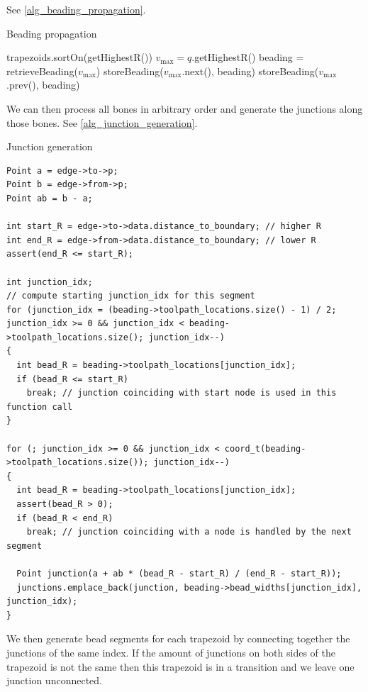 See \cref{alg_beading_propagation}.

\begin{algorithm}
\caption{Beading propagation}
\label{alg_beading_propagation}
\begin{algorithmic}
\State trapezoids.sortOn(getHighestR())
	\State $v_\text{max} = q$.getHighestR()
	\State beading = retrieveBeading($v_\text{max}$)
		\State storeBeading($v_\text{max}$.next(), beading)
	\EndIf
		\State storeBeading($v_\text{max}$.prev(), beading)
	\EndIf
\EndFor
\end{algorithmic}
\end{algorithm}


We can then process all bones in arbitrary order and generate the junctions along those bones.
See \cref{alg_junction_generation}.

\begin{algorithm}
\caption{Junction generation}
\label{alg_junction_generation}
\lstset{language=C++}
\begin{lstlisting}[frame=single]
Point a = edge->to->p;
Point b = edge->from->p;
Point ab = b - a;

int start_R = edge->to->data.distance_to_boundary; // higher R
int end_R = edge->from->data.distance_to_boundary; // lower R
assert(end_R <= start_R);

int junction_idx;
// compute starting junction_idx for this segment
for (junction_idx = (beading->toolpath_locations.size() - 1) / 2; junction_idx >= 0 && junction_idx < beading->toolpath_locations.size(); junction_idx--)
{
  int bead_R = beading->toolpath_locations[junction_idx];
  if (bead_R <= start_R)
    break; // junction coinciding with start node is used in this function call
}

for (; junction_idx >= 0 && junction_idx < coord_t(beading->toolpath_locations.size()); junction_idx--)
{
  int bead_R = beading->toolpath_locations[junction_idx];
  assert(bead_R > 0);
  if (bead_R < end_R)
    break; // junction coinciding with a node is handled by the next segment
  
  Point junction(a + ab * (bead_R - start_R) / (end_R - start_R));
  junctions.emplace_back(junction, beading->bead_widths[junction_idx], junction_idx);
}
\end{lstlisting}
\end{algorithm}


We then generate bead segments for each trapezoid by connecting together the junctions of the same index.
If the amount of junctions on both sides of the trapezoid is not the same then this trapezoid is in a transition and we leave one junction unconnected.



